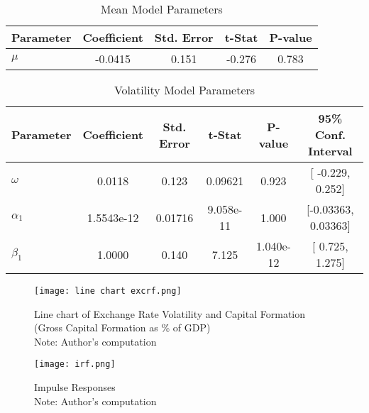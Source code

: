 \documentclass{article} %
\begin{document}
\begin{table}[h]
    \centering
    \caption{Mean Model Parameters}
    \begin{tabular}{lcccc}
        \toprule
        \textbf{Parameter} & \textbf{Coefficient} & \textbf{Std. Error} & \textbf{t-Stat} & \textbf{P-value} \\
        \midrule
        $\mu$ & -0.0415 & 0.151 & -0.276 & 0.783 \\
        \bottomrule
    \end{tabular}
\end{table}


\begin{table}[h]
    \centering
    \caption{Volatility Model Parameters}
    \begin{tabular}{lccccc}
        \toprule
        \textbf{Parameter} & \textbf{Coefficient} & \textbf{Std. Error} & \textbf{t-Stat} & \textbf{P-value} & \textbf{95\% Conf. Interval} \\
        \midrule
        $\omega$  & 0.0118  & 0.123   & 0.09621  & 0.923  & [ -0.229,  0.252] \\
        $\alpha_1$ & 1.5543e-12  & 0.01716 & 9.058e-11  & 1.000 & [-0.03363, 0.03363] \\
        $\beta_1$  & 1.0000  & 0.140   & 7.125   & 1.040e-12 & [ 0.725,  1.275] \\
        \bottomrule
    \end{tabular}
\end{table}

\begin{figure}[h] %
  \centering
  \texttt{[image: line chart excrf.png]} %
  \caption{Line chart of Exchange Rate Volatility and Capital Formation (Gross Capital Formation as \% of GDP)\\ Note: Author's computation }
  \label{fig:line excrf} %
\end{figure}

\begin{figure}[h] %
  \centering
  \texttt{[image: irf.png]} %
  \caption{Impulse Responses\\ Note: Author's computation }
  \label{fig:irf} %
\end{figure}
\end{document}

